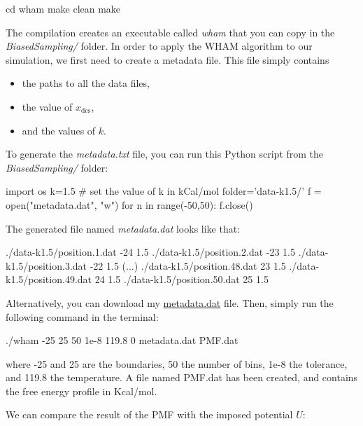 \begin{lcverbatim}
cd wham
make clean
make
\end{lcverbatim}

\noindent The compilation creates an executable called \textit{wham} that you can 
copy in the \textit{BiasedSampling/} folder.
In order to apply the WHAM algorithm to our simulation, we
first need to create a metadata file. This file simply
contains 

\begin{itemize}
\item the paths to all the data files,
\item the value of $x_\text{des}$,
\item and the values of $k$.
\end{itemize}

To generate the \textit{metadata.txt} file, you can run this Python script
from the \textit{BiasedSampling/} folder:

\begin{lcverbatim}
import os
k=1.5 # set the value of  k in kCal/mol
folder='data-k1.5/'
f = open("metadata.dat", "w")
for n in range(-50,50):
f.close()
\end{lcverbatim}

\noindent The generated file named \textit{metadata.dat} looks like that:

\begin{lcverbatim}
./data-k1.5/position.1.dat -24 1.5
./data-k1.5/position.2.dat -23 1.5
./data-k1.5/position.3.dat -22 1.5
(...)
./data-k1.5/position.48.dat 23 1.5
./data-k1.5/position.49.dat 24 1.5
./data-k1.5/position.50.dat 25 1.5
\end{lcverbatim}

\noindent Alternatively, you can download my \href{../../../../../inputs/level3/free-energy-calculation/BiasedSampling/metadata.dat}{metadata.dat} file.
Then, simply run the following command in the terminal:

\begin{lcverbatim}
./wham -25 25 50 1e-8 119.8 0 metadata.dat PMF.dat
\end{lcverbatim}

\noindent where -25 and 25 are the boundaries, 50 the number of bins,
1e-8 the tolerance, and 119.8 the temperature. A file named
PMF.dat has been created, and contains the free energy
profile in Kcal/mol.

We can compare the result of the PMF with the imposed potential $U$:

